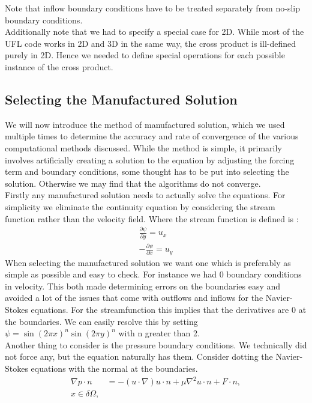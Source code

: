 \documentclass[11pt,twoside,a4paper]{article}
\begin{document}
Note that inflow boundary conditions have to be treated separately from no-slip boundary conditions.\\
Additionally note that we had to specify a special case for 2D. While most of the UFL code works in 2D and 3D in the same way, the cross product is ill-defined purely in 2D. Hence we needed to define special operations for each possible instance of the cross product.\\

\subsection{Selecting the Manufactured Solution}
We will now introduce the method of manufactured solution, which we used multiple times to determine the accuracy and rate of convergence of the various computational methods discussed. While the method is simple, it primarily involves artificially creating a solution to the equation by adjusting the forcing term and boundary conditions, some thought has to be put into selecting the solution. Otherwise we may find that the algorithms do not converge.\\
Firstly any manufactured solution needs to actually solve the equations. For simplicity we eliminate the continuity equation by considering the stream function rather than the velocity field. Where the stream function is defined is :
\begin{align*}
\frac{ \partial \psi}{\partial y} = u_x \\
-\frac{\partial \psi}{\partial x} = u_y
\end{align*}
When selecting the manufactured solution we want one which is preferably as simple as possible and easy to check. For instance we had $0$ boundary conditions in velocity. This both made determining errors on the boundaries easy and avoided a lot of the issues that come with outflows and inflows for the Navier-Stokes equations. For the streamfunction this implies that the derivatives are 0 at the boundaries. We can easily resolve this by setting $\psi = \sin(2 \pi x)^n \sin(2 \pi y)^n$ with n greater than 2.\\
Another thing to consider is the pressure boundary conditions. We technically did not force any, but the equation naturally has them. Consider dotting the Navier-Stokes equations with the normal at the boundaries.
\begin{align*}
\nabla p \cdot n &= -(u \cdot \nabla) u \cdot n  + \mu \nabla^2 u \cdot n + F \cdot n, \\
x \in \delta \Omega,
\end{align*}
\end{document}
